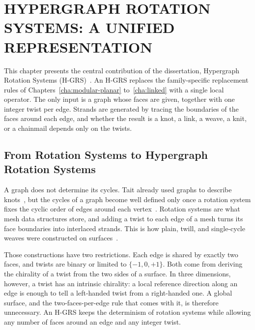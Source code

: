 %
%

\chapter{\uppercase{Hypergraph Rotation Systems: A Unified Representation}}
\label{cha:hgrs}

This chapter presents the central contribution of the dissertation, Hypergraph Rotation Systems (H-GRS)~\cite{yildiz2026hypergraph}. An H-GRS replaces the family-specific replacement rules of Chapters~\ref{cha:modular-planar} to~\ref{cha:linked} with a single local operator. The only input is a graph whose faces are given, together with one integer twist per edge. Strands are generated by tracing the boundaries of the faces around each edge, and whether the result is a knot, a link, a weave, a knit, or a chainmail depends only on the twists.

\section{From Rotation Systems to Hypergraph Rotation Systems}

A graph does not determine its cycles. Tait already used graphs to describe knots~\cite{tait1877knots}, but the cycles of a graph become well defined only once a rotation system fixes the cyclic order of edges around each vertex~\cite{edmonds1960combinatorial,gross2001topological}. Rotation systems are what mesh data structures store, and adding a twist to each edge of a mesh turns its face boundaries into interlaced strands. This is how plain, twill, and single-cycle weaves were constructed on surfaces~\cite{akleman2009cyclic,xing2010single,akleman2015extended,akleman2020topologically}.

Those constructions have two restrictions. Each edge is shared by exactly two faces, and twists are binary or limited to $\{-1,0,+1\}$. Both come from deriving the chirality of a twist from the two sides of a surface. In three dimensions, however, a twist has an intrinsic chirality: a local reference direction along an edge is enough to tell a left-handed twist from a right-handed one. A global surface, and the two-faces-per-edge rule that comes with it, is therefore unnecessary. An H-GRS keeps the determinism of rotation systems while allowing any number of faces around an edge and any integer twist.

